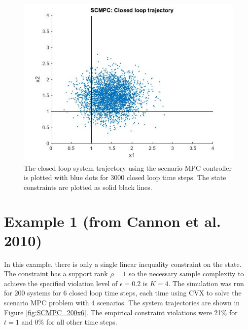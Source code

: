 \documentclass[12 pt]{report}
\begin{document}
\begin{figure}
	\includegraphics[width=\linewidth]{SCMPC_3000.jpg}
	\caption{The closed loop system trajectory using the scenario MPC controller is plotted with blue dots for 3000 closed loop time steps. The state constraints are plotted as solid black lines.}
	\label{fig:SCMPC_3000}
\end{figure}


\section{Example 1 (from Cannon et al. 2010)}

In this example, there is only a single linear inequality constraint on the state. The constraint has a support rank $\rho = 1$ so the necessary sample complexity to achieve the specified violation level of $\epsilon = 0.2$ is $K = 4$. The simulation was run for 200 systems for 6 closed loop time steps, each time using CVX to solve the scenario MPC problem with 4 scenarios. The system trajectories are shown in Figure \ref{fig:SCMPC_200x6}. The empirical constraint violations were 21\% for $t = 1$ and 0\% for all other time steps.
\end{document}
